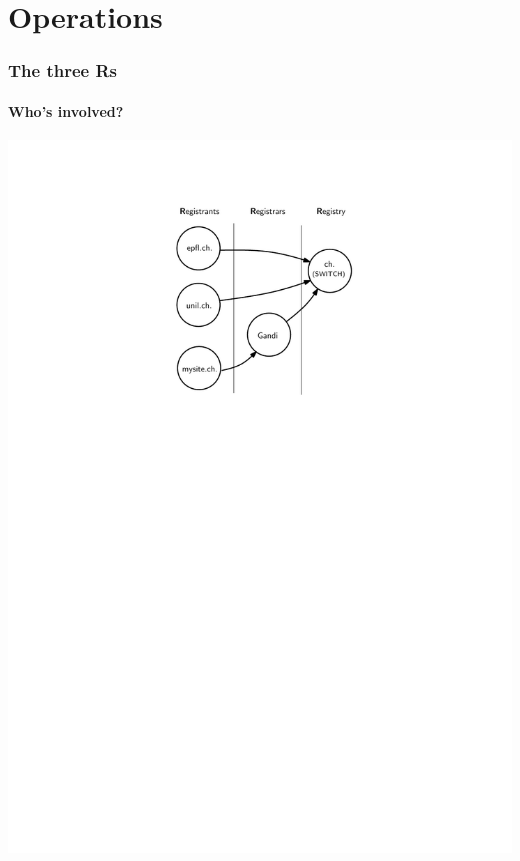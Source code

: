 \documentclass{beamer}
\begin{document}
\section{Operations}

\begin{frame}
  \frametitle{The three Rs}
  \framesubtitle{Who's involved?}

  \centering
  \includegraphics[width=.65\textwidth]{3Rs-sans}

\end{frame}
\end{document}
